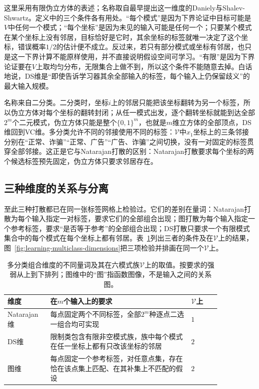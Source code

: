 这里采用有限伪立方体的表述；名称取自最早提出这一维度的Daniely与Shalev-Shwartz。定义中的三个条件各有用处。“每个模式”是因为下界论证中目标可能是$V$中任何一个模式；“每个坐标”是因为未见的输入可能是任何一个；只要某个模式在某个坐标上没有邻居，目标恰好是它时，其余坐标的标签就唯一决定了这个坐标，错误概率$1/2$的估计便不成立。反过来，若只有部分模式或坐标有邻居，也只是这一下界计算不能原样使用，并不直接说明假设空间可学习。“有限”是因为下界论证要在$V$上取均匀分布，无限集合上做不到，所以这个条件不能随意去掉。白话地说，DS维是“即使告诉学习器其余全部输入的标签，每个输入上仍保留歧义”的最大输入规模。

名称来自二分类。二分类时，坐标$i$上的邻居只能把该坐标翻转为另一个标签，所以伪立方体对每个坐标的翻转封闭；从任一模式出发，逐个翻转坐标就能到达全部$2^m$个二元模式，伪立方体只能是整个$\{0,1\}^m$，也就是$m$维立方体的全部顶点，DS维回到VC维。多分类允许不同的邻接使用不同的标签：$\mathcal V$中$x_1$坐标上的三条邻接分别在“正常、诈骗”“正常、广告”“广告、诈骗”之间切换，没有一对固定的标签贯穿全部邻接。这正是它与Natarajan打散的区别：Natarajan打散要求每个坐标的两个候选标签预先固定，伪立方体只要求邻居存在。

\subsection{三种维度的关系与分离}
\label{sec:lt6-dimension-relations}

至此三种打散都已在同一张标签网格上检验过。它们的差别在量词：Natarajan打散为每个输入指定一对标签，要求它们的全部组合出现；图打散为每个输入指定一个参考标签，要求“是否等于参考”的全部组合出现；DS打散只要求一个有限模式集合中的每个模式在每个坐标上都有邻居。表~\ref{tab:comb-multiclass-dimensions}列出三者的条件及在$\mathcal V$上的结果，图~\ref{fig:learning-multiclass-dimensions}把三项检验并排画在同一个$\mathcal V$上。

\begin{table}[htbp]
  \centering
  \begin{tabular}{p{0.15\linewidth}p{0.58\linewidth}p{0.12\linewidth}}
    \toprule
    维度 & 在$m$个输入上的要求 & $\mathcal V$上\\
    \midrule
    Natarajan维 & 每点固定两个不同标签，全部$2^m$种逐点二选一组合均可实现 & $1$\\
    DS维 & 限制类包含有限非空模式族，族中每个模式在任一坐标上都有只改该坐标的邻居 & $2$\\
    图维 & 每点固定一个参考标签，对任意点集，存在恰在该点集上匹配、在其补集上不匹配的假设 & $2$\\
    \bottomrule
  \end{tabular}
  \caption{多分类组合维度的不同量词及其在六模式族$\mathcal V$上的取值。按要求的强弱从上到下排列；图维中的“图”指函数图像，不是输入之间的关系图。}
  \label{tab:comb-multiclass-dimensions}
\end{table}

